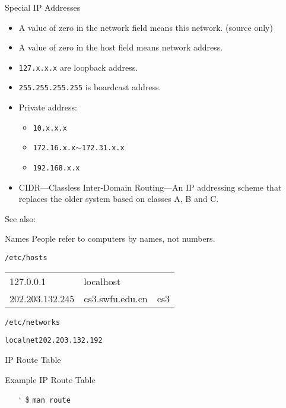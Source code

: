 \begin{frame}{Special IP Addresses}
  \begin{itemize}
  \item A value of zero in the network field means this network. (source only)
  \item A value of zero in the host field means network address.
  \item \texttt{127.x.x.x} are loopback address.
  \item \texttt{255.255.255.255} is boardcast address.
  \item Private address:
    \begin{itemize}
    \item \texttt{10.x.x.x}
    \item \texttt{172.16.x.x}$\sim$\texttt{172.31.x.x}
    \item \texttt{192.168.x.x}
    \end{itemize}
  \item CIDR---Classless Inter-Domain Routing---An IP addressing scheme that replaces the older
    system based on classes A, B and C.
  \end{itemize}
\end{frame}

See also: 

\begin{frame}{Names}
  People refer to computers by names, not numbers.
  \begin{iblock}{\texttt{/etc/hosts}}
    \begin{center}{\ttfamily
      \begin{tabular}{lll}
        127.0.0.1 & localhost&\\
        202.203.132.245 & cs3.swfu.edu.cn & cs3\\
      \end{tabular}}
    \end{center}
  \end{iblock}

  \begin{iblock}{\texttt{/etc/networks}}
    \begin{center}
      \texttt{localnet}\qquad \texttt{202.203.132.192}
    \end{center}
  \end{iblock}
\end{frame}

\begin{frame}{IP Route Table}
  \begin{iblock}{Example IP Route Table}
    \begin{center}
    \end{center}
  \end{iblock}
  \begin{itemize}
  \item[\char`~\$] \texttt{man route}
  \end{itemize}
\end{frame}

